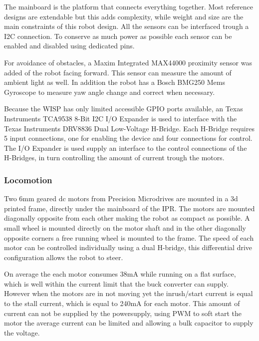 \documentclass[letterpaper, 10 pt, conference]{ieeeconf}  %
\begin{document}
The mainboard is the platform that connects everything together.
Most reference designs are extendable but this adds complexity, while weight and size are the main constraints of this robot design.
All the sensors can be interfaced trough a I2C connection.
To conserve as much power as possible each sensor can be enabled and disabled using dedicated pins.

For avoidance of obstacles, a Maxim Integrated MAX44000 proximity sensor was added of the robot facing forward.
This sensor can measure the amount of ambient light as well.
In addition the robot has a Bosch BMG250 Mems Gyroscope to measure yaw angle change and correct when necessary.


Because the WISP has only limited accessible GPIO ports available, an Texas Instruments TCA9538 8-Bit I2C I/O Expander is used to interface with the Texas Instruments DRV8836 Dual Low-Voltage H-Bridge.	
Each H-Bridge requires 5 input connections, one for enabling the device and four connections for control.
The I/O Expander is used supply an interface to the control connections of the H-Bridges, in turn controlling the amount of current trough the motors.

\subsubsection{Locomotion}

Two 6mm geared dc motors from Precision Microdrives are mounted in a 3d printed frame, directly under the mainboard of the IPR.
The motors are mounted diagonally opposite from each other making the robot as compact as possible.
A small wheel is mounted directly on the motor shaft and in the other diagonally opposite corners a free running wheel is mounted to the frame.
The speed of each motor can be controlled individually using a dual H-bridge, this differential drive configuration allows the robot to steer.

On average the each motor consumes 38mA while running on a flat surface, which is well within the current limit that the buck converter can supply.
However when the motors are in not moving yet the inrush/start current is equal to the stall current, which is equal to 240mA for each motor.
This amount of current can not be supplied by the powersupply, using PWM to soft start the motor the average current can be limited and allowing a bulk capacitor to supply the voltage.
\end{document}
